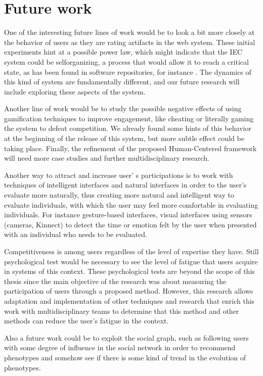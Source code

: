 \section{Future work}

One of the interesting future lines of work would be to look a bit more closely at the
behavior of users as they are rating artifacts in the web system. These initial
experiments hint at a possible power law, which might indicate that the IEC
system could be selforganizing, a process that would allow it to reach a
critical state, as has been found in software repositories, for instance \cite{merelo2016self}.
The dynamics of this kind of system are fundamentally different, and our future
research will include exploring these aspects of the system.

Another line of work would be to study the possible negative effects of using gamification
techniques to improve engagement, like cheating or literally gaming the system
to defeat competition. We already found some hints of this behavior at the
beginning of the release of this system, but more subtle effect could be taking
place. Finally, the refinement of the proposed Human-Centered framework will
need more case studies and further multidisciplinary research.

Another way to attract and increase user' s participations is to work with
techniques of intelligent interfaces and natural interfaces in order to the
user's evaluate more naturally, thus creating more natural and intelligent way
to evaluate individuals, with which the user may feel more comfortable in
evaluating individuals. For instance  gesture-based interfaces, visual
interfaces using sensors (cameras, Kinnect) to detect the time or emotion felt
by the user when presented with an individual who needs to be evaluated.

Competitiveness is among users regardless of the level of expertise they have.
Still psychological test would be necessary to see the level of fatigue that
users acquire in systems of this context. These psychological tests are beyond
the scope of this thesis since the main objective of the research was about
measuring the participation of users through a proposed method. However, this
research allows adaptation and implementation of other techniques and research
that enrich this work with multidisciplinary teams to determine that this method
and other methods can reduce the user's fatigue in the context.


Also a future work could be to exploit the social graph, such as following users
with some degree of influence in the social network in order to recommend
phenotypes and somehow see if there is some kind of trend in the evolution of
phenotypes.
